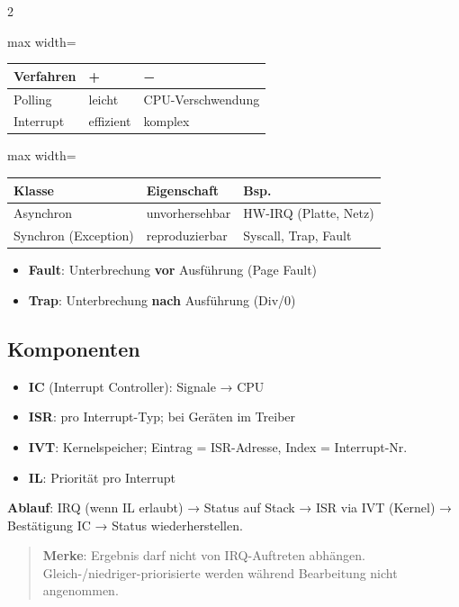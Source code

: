 \documentclass[10pt, a4paper]{article}
\begin{document}
\begin{multicols}{2}
{\small
\begin{adjustbox}{max width=\linewidth}
{\scriptsize
\begin{tabular}{lll}
\toprule
\textbf{Verfahren} & \textbf{+} & \textbf{−} \\
\midrule
Polling & leicht & CPU-Verschwendung \\
Interrupt & effizient & komplex \\
\bottomrule
\end{tabular}
}
\end{adjustbox}
}



{\small
\begin{adjustbox}{max width=\linewidth}
{\scriptsize
\begin{tabular}{lll}
\toprule
\textbf{Klasse} & \textbf{Eigenschaft} & \textbf{Bsp.} \\
\midrule
Asynchron & unvorhersehbar & HW-IRQ (Platte, Netz) \\
Synchron (Exception) & reproduzierbar & Syscall, Trap, Fault \\
\bottomrule
\end{tabular}
}
\end{adjustbox}
}


\begin{itemize}
  \item \textbf{Fault}: Unterbrechung \textbf{vor} Ausführung (Page Fault)
  \item \textbf{Trap}: Unterbrechung \textbf{nach} Ausführung (Div/0)
\end{itemize}


\subsection{Komponenten}
\begin{itemize}
  \item \textbf{IC} (Interrupt Controller): Signale → CPU
  \item \textbf{ISR}: pro Interrupt-Typ; bei Geräten im Treiber
  \item \textbf{IVT}: Kernelspeicher; Eintrag = ISR-Adresse, Index = Interrupt-Nr.
  \item \textbf{IL}: Priorität pro Interrupt
\end{itemize}

\textbf{Ablauf}: IRQ (wenn IL erlaubt) → Status auf Stack → ISR via IVT (Kernel) → Bestätigung IC → Status wiederherstellen.


\begin{quote}
\textbf{Merke}: Ergebnis darf nicht von IRQ-Auftreten abhängen. Gleich-/niedriger-priorisierte werden während Bearbeitung nicht angenommen.
\end{quote}



\end{multicols}
\end{document}
